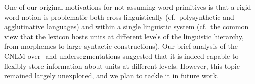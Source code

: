 One of our original motivations for not assuming word primitives is that a rigid word notion is problematic both cross-linguistically (cf.~polysynthetic and agglutinative languages) and within a single linguistic system (cf.~the common  view  that the lexicon hosts units at different levels of the linguistic hierarchy, from  morphemes to large syntactic constructions). Our brief analysis of the CNLM over- and undersegmentations suggested that it is indeed capable to flexibly store information about units at different levels. However, this topic  remained largely unexplored, and we plan to tackle it in future work.



